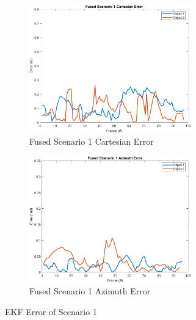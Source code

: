   \newpage 
  \begin{figure}[!htb]
    \hspace{0.1\textwidth}
    \begin{subfigure}[b]{0.3\textwidth}%
        \includegraphics[width=7cm]{Figures/matlab/Fused Scenario 1 Cartesian Error.png}
        \caption{Fused Scenario 1 Cartesian Error}
        \label{subfig:err_cart_1}
    \end{subfigure}
    \hspace{0.15\textwidth}
    \begin{subfigure}[b]{0.3\textwidth}%
        \includegraphics[width=7cm]{Figures/matlab/Fused Scenario 1 Azimuth Error.png}
        \caption{Fused Scenario 1 Azimuth Error}
        \label{subfig:err_azi_1}
    \end{subfigure}

    \caption{EKF Error of Scenario 1}
    \label{fig:error_1}
\end{figure}
